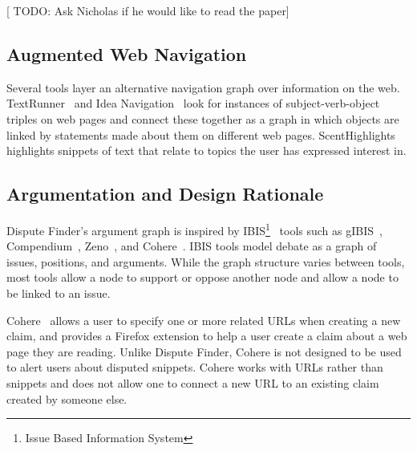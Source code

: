 \documentclass{www2010-submission}
\newcommand{\todo}[1]{{[\color{blue} TODO: #1]}}
\begin{document}
\todo{Ask Nicholas if he would like to read the paper}

\subsection{Augmented Web Navigation}

Several tools layer an alternative navigation graph over information on the web. TextRunner~\cite{Etzioni2008} and Idea Navigation~\cite{Etzioni2008} look for instances of subject-verb-object triples on web pages and connect these together as a graph in which objects are linked by statements made about them on different web pages. ScentHighlights~\cite{Chi2005a} highlights snippets of text that relate to topics the user has expressed interest in. 


% 

% 

\subsection{Argumentation and Design Rationale}

Dispute Finder's argument graph is inspired by IBIS\footnote{Issue Based Information System}~\cite{Rittel1973} tools such as gIBIS~\cite{Conklin1987a}, Compendium~\cite{Selvin2001}, Zeno~\cite{Gordon1997}, and Cohere~\cite{Shum2008}. IBIS tools model debate as a graph of issues, positions, and arguments. While the graph structure varies between tools, most tools allow a node to support or oppose another node and allow a node to be linked to an issue. 

Cohere~\cite{Shum2008} allows a user to specify one or more related URLs when creating a new claim, and provides a Firefox extension to help a user create a claim about a web page they are reading. Unlike Dispute Finder, Cohere is not designed to be used to alert users about disputed snippets. Cohere works with URLs rather than snippets and does not allow one to connect a new URL to an existing claim created by someone else. 
\end{document}
